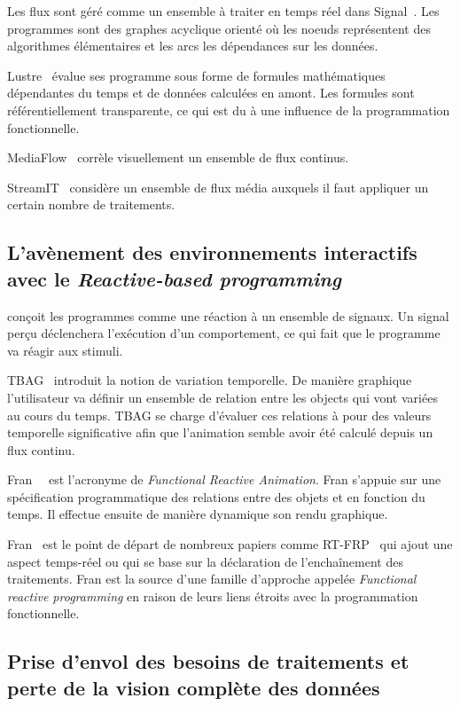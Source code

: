 \documentclass{llncs}
\newcommand{\RP}{\emph{Reactive-based programming} }
\newcommand{\FRP}{\emph{Functional reactive programming} }
\begin{document}
Les flux sont géré comme un ensemble à traiter en temps réel dans Signal~\cite{Benveniste85}.
Les programmes sont des graphes acyclique orienté où les noeuds représentent des
algorithmes élémentaires et les arcs les dépendances sur les données.

Lustre~\cite{Caspi87} évalue ses programme sous forme de formules mathématiques
dépendantes du temps et de données calculées en amont.
Les formules sont référentiellement transparente, ce qui est du à une influence
de la programmation fonctionnelle.

MediaFlow~\cite{Elliott95} corrèle visuellement un ensemble de flux continus.

StreamIT~\cite{Thies02} considère un ensemble de flux média auxquels il faut
appliquer un certain nombre de traitements.

\subsection{L'avènement des environnements interactifs avec le \RP}
\cite{Andre96} conçoit les programmes comme une réaction à un ensemble de
signaux. Un signal perçu déclenchera l'exécution d'un comportement, ce qui
fait que le programme va réagir aux stimuli.

TBAG~\cite{Elliott94} introduit la notion de variation temporelle.
De manière graphique l'utilisateur va définir un ensemble de relation
entre les objects qui vont variées au cours du temps.
TBAG se charge d'évaluer ces relations à pour des valeurs temporelle
significative afin que l'animation semble avoir été calculé depuis
un flux continu.

Fran~\cite{Elliott97}~\cite{Elliott98} est l'acronyme de \emph{Functional Reactive Animation}.
Fran s'appuie sur une spécification programmatique des relations entre des objets
et en fonction du temps.
Il effectue ensuite de manière dynamique son rendu graphique.

Fran~\cite{Elliott97} est le point de départ de nombreux papiers comme RT-FRP~\cite{Wan02}
qui ajout une aspect temps-réel ou \cite{Nilsson2002a} qui se base sur la déclaration
de l'enchaînement des traitements.
Fran est la source d'une famille d'approche appelée \FRP en raison de leurs liens
étroits avec la programmation fonctionnelle.

\subsection{Prise d'envol des besoins de traitements et perte de la vision complète des données}
\end{document}
